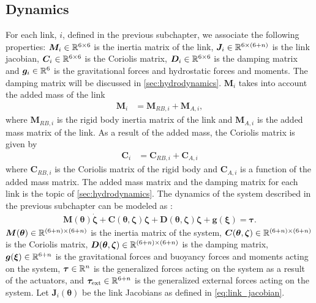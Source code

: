 \fi %


\subsection{Dynamics}

For each link, $i$, defined in the previous subchapter, we associate the following
properties: $\bm{M}_i \in \mathbb{R}^{6 \times 6}$ is the inertia matrix of the link,
$\bm{J}_i \in \mathbb{R}^{6 \times (6+n)}$ is the link jacobian, $\bm{C}_i \in \mathbb{R}^{6 \times 6}$
is the Coriolis matrix, $\bm{D}_i \in \mathbb{R}^{6 \times 6}$ is the damping matrix and
$\bm{g}_i \in \mathbb{R}^{6}$ is the gravitational forces and hydrostatic forces and moments.
The damping matrix will be discussed in \autoref{sec:hydrodynamics}.
$\bm{M}_i$ takes into account the added mass of the link
\begin{align}
    \bm{M}_i &= \bm{M}_{RB,i} + \bm{M}_{A,i},
\end{align}
where $\bm{M}_{RB,i}$ is the rigid body inertia matrix of the link and $\bm{M}_{A,i}$
is the added mass matrix of the link. As a result of the added mass, the Coriolis
matrix is given by
\begin{align}
    \bm{C}_i &= \bm{C}_{RB,i} + \bm{C}_{A,i}
\end{align}
where $\bm{C}_{RB,i}$ is the Coriolis matrix of the rigid body and $\bm{C}_{A,i}$
is a function of the added mass matrix. The added mass matrix and the damping matrix
for each link is the topic of \autoref{sec:hydrodynamics}. The dynamics of the
system described in the previous subchapter can be modeled as
\cite{from2014}:
\begin{align}
    \bm{M}(\bm{\theta})\dot{\bm{\zeta}} +
        \bm{C}(\bm{\theta}, \bm{\zeta}) \bm{\zeta} +
        \bm{D}(\bm{\theta}, \bm{\zeta}) \bm{\zeta} +
        \bm{g}(\bm{\xi}) =
        \bm{\tau}.
\end{align}
$\bm{M}(\bm{\theta}) \in \mathbb{R}^{(6+n)\times(6+n)}$  is the inertia matrix of the
system, $\bm{C}(\bm{\theta}, \bm{\zeta}) \in \mathbb{R}^{(6+n)\times(6+n)}$ is the
Coriolis matrix, $\bm{D}(\bm{\theta}, \bm{\zeta}) \in \mathbb{R}^{(6+n)\times(6+n)}$ is
the damping matrix, $\bm{g}(\bm{\xi}) \in \mathbb{R}^{6+n}$ is the gravitational forces
and buoyancy forces and moments acting on the system, $\bm{\tau} \in \mathbb{R}^{n}$ is the generalized
forces acting on the system as a result of the actuators,
and $\bm{\tau}_{\mathrm{ext}} \in \mathbb{R}^{6+n}$ is the
generalized external forces acting on the system. Let $\bm{J}_{i}(\bm{\theta})$
be the link Jacobians as defined in \autoref{eq:link_jacobian}.
